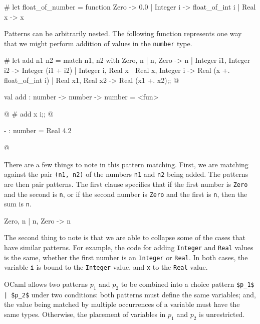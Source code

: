 \begin{ocaml}
# let float_of_number = function
     Zero -> 0.0
   | Integer i -> float_of_int i
   | Real x -> x
\end{ocaml}
%
Patterns can be arbitrarily nested.  The following
function represents one way that we might perform addition of values
in the \hbox{\lstinline/number/} type.

\begin{ocaml}
# let add n1 n2 =
     match n1, n2 with
        Zero, n
      | n, Zero ->
          n
      | Integer i1, Integer i2 ->
          Integer (i1 + i2)
      | Integer i, Real x
      | Real x, Integer i ->
          Real (x +. float_of_int i)
      | Real x1, Real x2 ->
          Real (x1 +. x2);;
@
\begin{topoutput}
val add : number -> number -> number = <fun>
\end{topoutput}
@
# add x i;;
@
\begin{topoutput}
- : number = Real 4.2
\end{topoutput}
@
\end{ocaml}
%
There are a few things to note in this pattern matching.  First, we
are matching against the pair \hbox{\lstinline/(n1, n2)/} of the numbers \hbox{\lstinline/n1/}
and \hbox{\lstinline/n2/} being added.  The patterns are then pair patterns.  The
first clause specifies that if the first number is \hbox{\lstinline/Zero/} and the
second is \hbox{\lstinline/n/}, or if the second number is \hbox{\lstinline/Zero/} and the
first is \hbox{\lstinline/n/}, then the sum is \hbox{\lstinline/n/}.

\begin{ocaml}
        Zero, n
      | n, Zero ->
          n
\end{ocaml}
%
The second thing to note is that we are able to collapse some of the
cases that have similar patterns.  For example, the code for adding
\hbox{\lstinline/Integer/} and \hbox{\lstinline/Real/} values is the same, whether the first
number is an \hbox{\lstinline/Integer/} or \hbox{\lstinline/Real/}.  In both cases, the
variable \hbox{\lstinline/i/} is bound to the \hbox{\lstinline/Integer/} value, and \hbox{\lstinline/x/}
to the \hbox{\lstinline/Real/} value.

OCaml allows two patterns $p_1$ and $p_2$ to be combined into a choice
pattern \hbox{\lstinline/$p_1$ | $p_2$/} under two conditions: both patterns must define
the same variables; and, the value being matched by multiple occurrences of
a variable must have the same types.  Otherwise, the placement of
variables in $p_1$ and $p_2$ is unrestricted.

